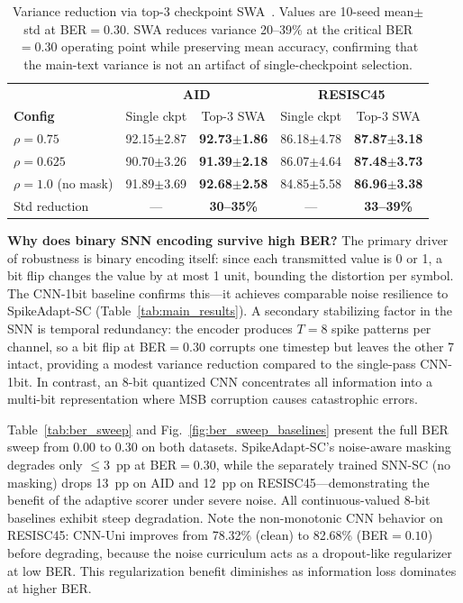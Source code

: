 \documentclass[conference]{IEEEtran}
\begin{document}
\begin{table}[t]
\renewcommand{\arraystretch}{1.10}
\centering
\small
\caption{Variance reduction via top-3 checkpoint SWA~\cite{izmailov2018swa}. Values are 10-seed mean$\pm$std at BER$=0.30$. SWA reduces variance 20--39\% at the critical BER$=0.30$ operating point while preserving mean accuracy, confirming that the main-text variance is not an artifact of single-checkpoint selection.}
\label{tab:ensemble}
\setlength{\tabcolsep}{3pt}
\begin{tabular}{l cc cc}
\toprule
& \multicolumn{2}{c}{\textbf{AID}} & \multicolumn{2}{c}{\textbf{RESISC45}} \\
\textbf{Config} & Single ckpt & Top-3 SWA & Single ckpt & Top-3 SWA \\
\midrule
$\rho{=}0.75$ & 92.15$\pm$2.87 & \textbf{92.73$\pm$1.86} & 86.18$\pm$4.78 & \textbf{87.87$\pm$3.18} \\
$\rho{=}0.625$ & 90.70$\pm$3.26 & \textbf{91.39$\pm$2.18} & 86.07$\pm$4.64 & \textbf{87.48$\pm$3.73} \\
$\rho{=}1.0$ (no mask) & 91.89$\pm$3.69 & \textbf{92.68$\pm$2.58} & 84.85$\pm$5.58 & \textbf{86.96$\pm$3.38} \\
\midrule
Std reduction & --- & \textbf{30--35\%} & --- & \textbf{33--39\%} \\
\bottomrule
\end{tabular}
\end{table}

\textbf{Why does binary SNN encoding survive high BER?} The primary driver of robustness is binary encoding itself: since each transmitted value is 0 or 1, a bit flip changes the value by at most 1 unit, bounding the distortion per symbol. The CNN-1bit baseline confirms this---it achieves comparable noise resilience to SpikeAdapt-SC (Table~\ref{tab:main_results}). A secondary stabilizing factor in the SNN is temporal redundancy: the encoder produces $T{=}8$ spike patterns per channel, so a bit flip at BER$=0.30$ corrupts one timestep but leaves the other 7 intact, providing a modest variance reduction compared to the single-pass CNN-1bit. In contrast, an 8-bit quantized CNN concentrates all information into a multi-bit representation where MSB corruption causes catastrophic errors.

Table~\ref{tab:ber_sweep} and Fig.~\ref{fig:ber_sweep_baselines} present the full BER sweep from 0.00 to 0.30 on both datasets. SpikeAdapt-SC's noise-aware masking degrades only $\leq$3~pp at BER$=0.30$, while the separately trained SNN-SC (no masking) drops 13~pp on AID and 12~pp on RESISC45---demonstrating the benefit of the adaptive scorer under severe noise. All continuous-valued 8-bit baselines exhibit steep degradation. Note the non-monotonic CNN behavior on RESISC45: CNN-Uni improves from 78.32\% (clean) to 82.68\% (BER$=0.10$) before degrading, because the noise curriculum acts as a dropout-like regularizer at low BER. This regularization benefit diminishes as information loss dominates at higher BER.
\end{document}
